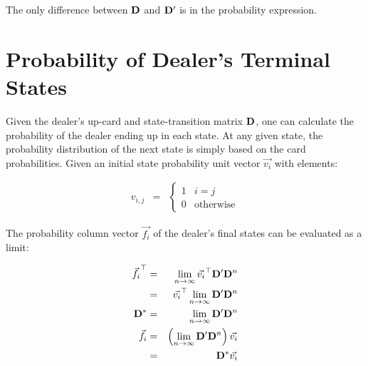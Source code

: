 \noindent
The only difference between $\mathbf{D}$ and $\mathbf{D^\prime}$
is in the probability expression.  


\section{Probability of Dealer's Terminal States}
\label{sec:dealer-play:final-pdf}

Given the dealer's up-card and state-transition matrix $\mathbf{D}$, 
one can calculate the probability of the dealer ending up in each state.
At any given state, the probability distribution of the
next state is simply based on the card probabilities.  
Given an initial state probability unit vector $\Vec{v_i}$ with elements:

\begin{eqnarray}
v_{i,j} &=& 
\begin{cases}
1 & i=j \\
0 & \text{otherwise}
\end{cases}
\end{eqnarray}

\noindent
The probability column vector $\Vec{f_i}$ of the dealer's final states 
can be evaluated as a limit:

\begin{eqnarray}
\vec{f_i}^{\top} &=& \lim_{n\rightarrow{}\infty}{\vec{v_i}^{\top}\mathbf{D^\prime}\mathbf{D}^n} \nonumber \\
&=& \vec{v_i}^{\top} \lim_{n\rightarrow{}\infty}{\mathbf{D^\prime}\mathbf{D}^n} \\
\mathbf{D^*} &=& \lim_{n\rightarrow{}\infty}{\mathbf{D^\prime}\mathbf{D}^n} \\
\vec{f_i} &=& \left(\lim_{n\rightarrow{}\infty}{\mathbf{D^\prime}\mathbf{D}^n}\right) \vec{v_i} \nonumber \\
&=& \mathbf{D^*} \vec{v_i}
\end{eqnarray}


